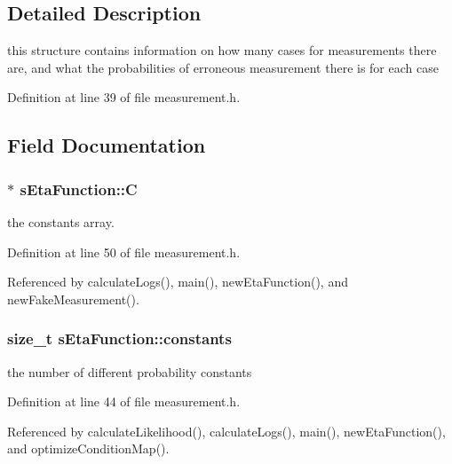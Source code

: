 \subsection{\-Detailed \-Description}
this structure contains information on how many cases for measurements there are, and what the probabilities of erroneous measurement there is for each case 

\-Definition at line 39 of file measurement.\-h.



\subsection{\-Field \-Documentation}
\hypertarget{structsEtaFunction_a05c2f93c1148d5268d359d78540c10be}{
\subsubsection[{\-C}]{$\ast$ {\bf s\-Eta\-Function\-::\-C}}}\label{structsEtaFunction_a05c2f93c1148d5268d359d78540c10be}


the constants array. 



\-Definition at line 50 of file measurement.\-h.



\-Referenced by calculate\-Logs(), main(), new\-Eta\-Function(), and new\-Fake\-Measurement().

\hypertarget{structsEtaFunction_a1fdf63f3a73e7fd663491e72421619f9}{
\subsubsection[{constants}]{\setlength{\rightskip}{0pt plus 5cm}size\-\_\-t {\bf s\-Eta\-Function\-::constants}}}\label{structsEtaFunction_a1fdf63f3a73e7fd663491e72421619f9}


the number of different probability constants 



\-Definition at line 44 of file measurement.\-h.



\-Referenced by calculate\-Likelihood(), calculate\-Logs(), main(), new\-Eta\-Function(), and optimize\-Condition\-Map().


